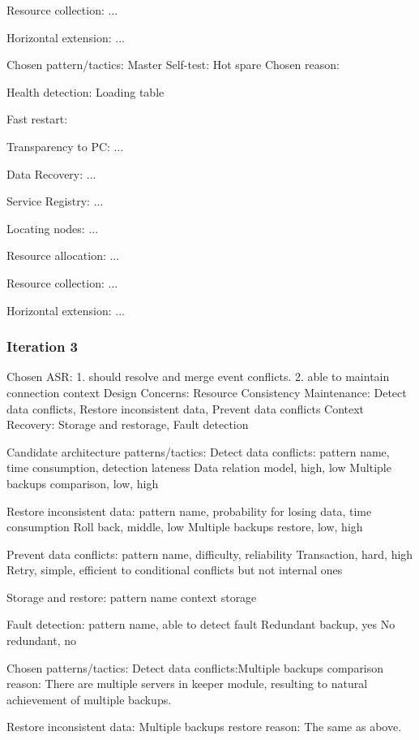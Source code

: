\documentclass{article}
\begin{document}
		Resource collection:
			... 

		Horizontal extension:
			...

		Chosen pattern/tactics:
			Master Self-test:
				Hot spare
			Chosen reason: 

			Health detection:
				Loading table
			
			Fast restart:
				
			
			Transparency to PC:
				...
			
			Data Recovery:
				...
			
			Service Registry:
				...
			
			Locating nodes:
				... 

			Resource allocation:
				...

			Resource collection:
				... 

			Horizontal extension:
				...
		
		\subsubsection{Iteration 3}
		Chosen ASR: 
		1. should resolve and merge event conflicts.
		2. able to maintain connection context
		Design Concerns: 
		Resource Consistency Maintenance: Detect data conflicts, Restore inconsistent data, Prevent data conflicts
		Context Recovery: Storage and restorage, Fault detection

		Candidate architecture patterns/tactics:
		Detect data conflicts:
			pattern name, time consumption, detection lateness
			Data relation model, high, low
			Multiple backups comparison, low, high
		
		Restore inconsistent data:
			pattern name, probability for losing data, time consumption
			Roll back, middle, low
			Multiple backups restore, low, high
		
		Prevent data conflicts:
			pattern name, difficulty, reliability
			Transaction, hard, high
			Retry, simple, efficient to conditional conflicts but not internal ones

		Storage and restore:
			pattern name
			context storage

		Fault detection:
			pattern name, able to detect fault
			Redundant backup, yes
			No redundant, no
		
		
		Chosen patterns/tactics:
		Detect data conflicts:Multiple backups comparison
		reason: There are multiple servers in keeper module, resulting to natural achievement of multiple backups.   

		Restore inconsistent data: Multiple backups restore
		reason: The same as above.
\end{document}

